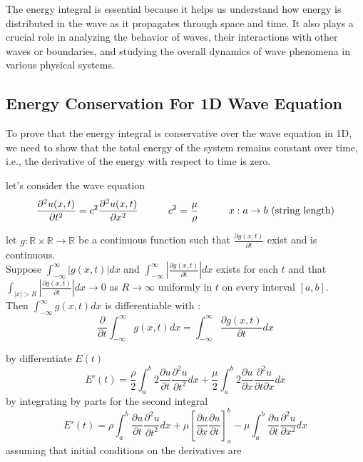 \documentclass[]{article}
\begin{document}
The energy integral is essential because it helps us understand how energy is distributed in the wave as it propagates through space and time. It also plays a crucial role in analyzing the behavior of waves, their interactions with other waves or boundaries, and studying the overall dynamics of wave phenomena in various physical systems.

\subsection{Energy Conservation For 1D Wave Equation}
To prove that the energy integral is conservative over the wave equation in 1D,
we need to show that the total energy of the system remains constant over time, i.e., the derivative of the energy with respect to time is zero.
\par
let's consider the wave equation
\[
    \frac{\partial^2 u(x,t)}{\partial t^2} = c^2 \frac{\partial^2 u(x,t)}{\partial x^2} \quad\quad\quad c^2 = \frac{\mu}{\rho} \quad\quad\quad x : a\to b \text{ (string length)}
\]
\begin{theorem}
    let $g : \mathbb{R}\times\mathbb{R} \to \mathbb{R}$ be a continuous function such that $\displaystyle \frac{\partial g(x,t)}{\partial t}$ exist and is continuous.
    \\
    Suppose $\displaystyle \int_{-\infty}^{\infty} |g(x,t)| dx $  and   $\displaystyle \int_{-\infty}^{\infty} |\frac{\partial g(x,t)}{\partial t}| dx $ exists for each $t$
    and that $\displaystyle \int_{|x|>R} |\frac{\partial g(x,t)}{\partial t}| dx \to 0 $ as $R \to \infty$ uniformly in $t$ on every interval $[a,b]$.\
    \\
    Then $\displaystyle \int_{-\infty}^{\infty} g(x,t) dx $ is differentiable with :
    \[
        \frac{\partial}{\partial t} \int_{-\infty}^{\infty} g(x,t) dx = \int_{-\infty}^{\infty} \frac{\partial g(x,t)}{\partial t} dx
    \]
\end{theorem}
by differentiate $E(t)$
\[
E'(t) = \frac{\rho}{2} \int_{a}^{b} 2\frac{\partial u}{\partial t}\frac{\partial^2 u}{\partial t^2} dx + \frac{\mu}{2} \int_{a}^{b} 2\frac{\partial u}{\partial x}\frac{\partial^2 u}{\partial t\partial x} dx    
\]
by integrating by parts for the second integral 
\[
E'(t) = \rho \int_{a}^{b} \frac{\partial u}{\partial t}\frac{\partial^2 u}{\partial t^2} dx +\mu\left[\frac{\partial u}{\partial x}\frac{\partial u}{\partial t}\right]_{a}^{b} -\mu \int_{a}^{b} \frac{\partial u}{\partial t}\frac{\partial^2 u}{\partial x^2} dx    
\]
\newpage 
assuming that initial conditions on the derivatives are
\end{document}
